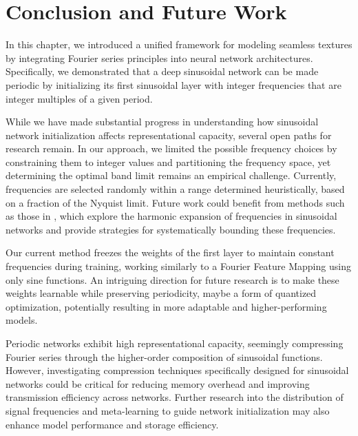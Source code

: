 


\section{Conclusion and Future Work}

In this chapter, we introduced a unified framework for modeling seamless textures by integrating Fourier series principles into neural network architectures. Specifically, we demonstrated that a deep sinusoidal network can be made periodic by initializing its first sinusoidal layer with integer frequencies that are integer multiples of a given period.

While we have made substantial progress in understanding how sinusoidal network initialization affects representational capacity, several open paths for research remain. In our approach, we limited the possible frequency choices by constraining them to integer values and partitioning the frequency space, yet determining the optimal band limit remains an empirical challenge. Currently, frequencies are selected randomly within a range determined heuristically, based on a fraction of the Nyquist limit. Future work could benefit from methods such as those in \cite{tamingFactory}, which explore the harmonic expansion of frequencies in sinusoidal networks and provide strategies for systematically bounding these frequencies.

Our current method freezes the weights of the first layer to maintain constant frequencies during training, working similarly to a Fourier Feature Mapping using only sine functions. An intriguing direction for future research is to make these weights learnable while preserving periodicity, maybe a form of quantized optimization, potentially resulting in more adaptable and higher-performing models.


Periodic networks exhibit high representational capacity, seemingly compressing Fourier series through the higher-order composition of sinusoidal functions. However, investigating compression techniques specifically designed for sinusoidal networks could be critical for reducing memory overhead and improving transmission efficiency across networks. Further research into the distribution of signal frequencies and meta-learning to guide network initialization may also enhance model performance and storage efficiency.

